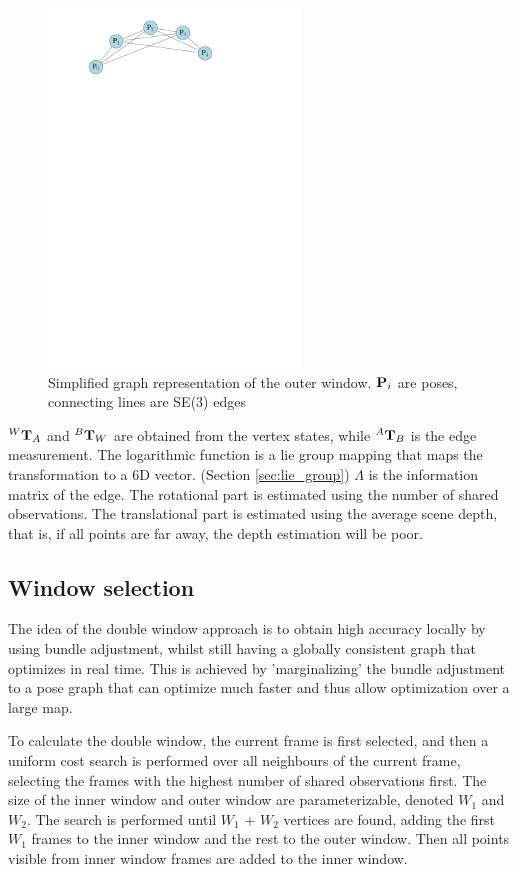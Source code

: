 \begin{figure}[h!]
  \centering
    \includegraphics[width=0.6\textwidth]{chapters/images/outer_window}
  \caption{Simplified graph representation of the outer window.  $\mathbf P_i$ are poses, connecting lines are SE(3) edges}
  \label{fig:outer_window}
\end{figure}

$^{W}\mathbf T_{A}$ and $^{B} \mathbf T_{W}$ are obtained from the vertex states, while $^{A} \mathbf T_{B}$ is the edge measurement.  The logarithmic function is a lie group mapping that maps the transformation to a 6D vector. (Section \ref{sec:lie_group})  $\Lambda$ is the information matrix of the edge.  The rotational part is estimated using the number of shared observations.  The translational part is estimated using the average scene depth, that is, if all points are far away, the depth estimation will be poor.

\subsection{Window selection}

The idea of the double window approach is to obtain high accuracy locally by using bundle adjustment, whilst still having a globally consistent graph that optimizes in real time.  This is achieved by 'marginalizing' the bundle adjustment to a pose graph that can optimize much faster and thus allow optimization over a large map.

To calculate the double window, the current frame is first selected, and then a uniform cost search is performed over all neighbours of the current frame, selecting the frames with the highest number of shared observations first. The size of the inner window and outer window are parameterizable, denoted $W_1$ and $W_2$. The search is performed until $W_1$ + $W_2$ vertices are found, adding the first $W_1$ frames to the inner window and the rest to the outer window. Then all points visible from inner window frames are added to the inner window.  


